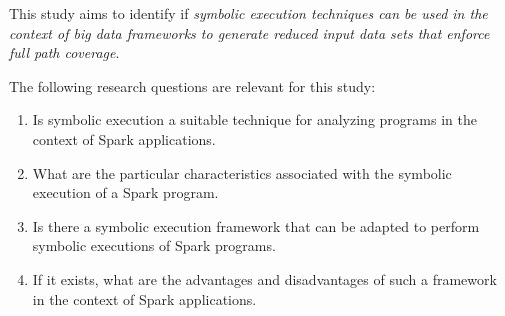 \label{ch:introduction}













This study aims to identify if \textit{symbolic execution techniques can be used in the context of big data frameworks to generate reduced input data sets that enforce full path coverage}.


The following research questions are relevant for this study:

\begin{enumerate}
	\item Is symbolic execution a suitable technique for analyzing programs in the context of Spark applications.
	\item What are the particular characteristics associated with the symbolic execution of a Spark program.
	\item Is there a symbolic execution framework that can be adapted to perform symbolic executions of Spark programs.
	\item If it exists, what are the advantages and disadvantages of such a framework in the context of Spark applications.	
\end{enumerate}

